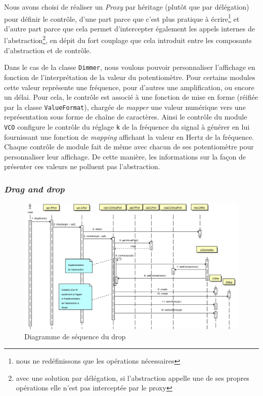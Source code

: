 Nous avons choisi de réaliser un \emph{Proxy} par héritage (plutôt
que par délégation) pour définir le contrôle, d'une part parce que
c'est plus pratique à écrire\footnote{nous ne redéfinissons que les
opérations nécessaires} et d'autre part parce que cela permet
d'intercepter également les appels internes de l'abstraction\footnote{avec
une solution par délégation, si l'abstraction appelle une de ses
propres opérations elle n'est pas interceptée par le
proxy}, en dépit du fort couplage que cela introduit entre les
composants d'abstraction et de contrôle.

Dans le cas de la classe \verb!Dimmer!, nous voulons pouvoir
personnaliser l'affichage en fonction de l'interprétation de la
valeur du potentiomètre. Pour certains modules cette valeur
représente une fréquence, pour d'autres une amplification, ou
encore un délai. Pour cela, le contrôle est associé à une fonction
de mise en forme (réifiée par la classe \verb!ValueFormat!),
chargée de \emph{mapper} une valeur numérique vers une
représentation sous forme de chaîne de caractères. Ainsi le
contrôle du module \verb!VCO! configure le contrôle du réglage
\verb!k! de la fréquence du signal à générer en lui fournissant une
fonction de \emph{mapping} affichant la valeur en Hertz de la
fréquence. Chaque contrôle de module fait de même avec chacun de
ses potentiomètre pour personnaliser leur affichage. De cette
manière, les informations sur la façon de présenter ces valeurs ne
polluent pas l'abstraction.

\subsubsection{\textit{Drag and drop}}

\begin{figure}[p]
\centering
\includegraphics[width=23cm, angle=90]{../img/ps/drop-sequence.pdf}
\caption{Diagramme de séquence du drop}
\label{drop-sequence}
\end{figure}

